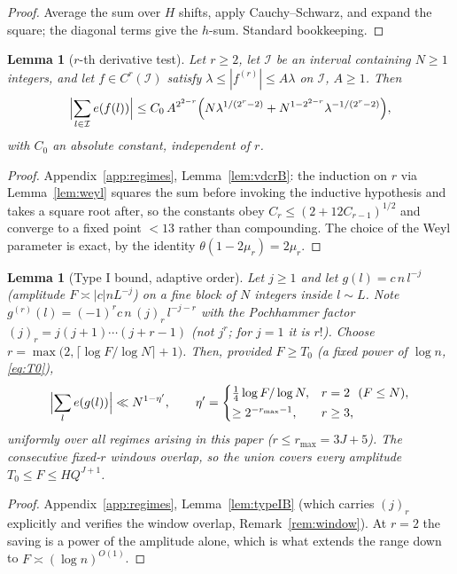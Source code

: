 \documentclass[11pt]{article}
\newtheorem{lemma}[theorem]{Lemma}
\theoremstyle{definition}
\theoremstyle{plain}
\begin{document}
\begin{proof}
Average the sum over $H$ shifts, apply Cauchy--Schwarz, and expand the
square; the diagonal terms give the $h$-sum.  Standard bookkeeping.
\end{proof}

\begin{lemma}[$r$-th derivative test]\label{lem:vdcr}
Let $r\ge2$, let $\mathcal I$ be an interval containing $N\ge1$
integers, and let $f\in C^r(\mathcal I)$ satisfy
$\lambda\le|f^{(r)}|\le A\lambda$ on $\mathcal I$, $A\ge1$.  Then
\[
\Bigl|\sum_{l\in\mathcal I}e(f(l))\Bigr|
\le C_{0}\,A^{2^{2-r}}\Bigl(N\lambda^{1/(2^{r}-2)}
+N^{1-2^{2-r}}\lambda^{-1/(2^{r}-2)}\Bigr),
\]
with $C_{0}$ an absolute constant, independent of $r$.
\end{lemma}

\begin{proof}
Appendix~\ref{app:regimes}, Lemma~\ref{lem:vdcrB}: the induction on $r$ via
Lemma~\ref{lem:weyl} squares the sum before invoking the inductive
hypothesis and takes a square root after, so the constants obey
$C_r\le(2+12C_{r-1})^{1/2}$ and converge to a fixed point $<13$ rather
than compounding.  The choice of the Weyl parameter is exact, by the
identity $\theta(1-2\mu_r)=2\mu_r$.
\end{proof}

\begin{lemma}[Type I bound, adaptive order]\label{lem:typeI}
Let $j\ge1$ and let $g(l)=c\,n\,l^{-j}$ (amplitude $F\asymp|c|nL^{-j}$)
on a fine block of $N$ integers inside $l\sim L$.  Note
$g^{(r)}(l)=(-1)^r c\,n\,(j)_r\,l^{-j-r}$ with the Pochhammer factor
$(j)_r=j(j+1)\cdots(j+r-1)$ (not $j^r$; for $j=1$ it is $r!$).  Choose
$r=\max\bigl(2,\lceil\log F/\log N\rceil+1\bigr)$.  Then, provided
$F\ge T_0$ (a fixed power of $\log n$, \eqref{eq:T0}),
\[
\Bigl|\sum_{l}e(g(l))\Bigr|\ll N^{1-\eta'},
\qquad
\eta'=\begin{cases}
\tfrac14\log F/\log N,& r=2\ \ (F\le N),\\[2pt]
\ge2^{-r_{\max}-1},& r\ge3,
\end{cases}
\]
uniformly over all regimes arising in this paper ($r\le r_{\max}=3J+5$).
The consecutive fixed-$r$ windows overlap, so the union covers every
amplitude $T_0\le F\le HQ^{J+1}$.
\end{lemma}

\begin{proof}
Appendix~\ref{app:regimes}, Lemma~\ref{lem:typeIB} (which carries $(j)_r$
explicitly and verifies the window overlap, Remark~\ref{rem:window}).
At $r=2$ the saving is a power of the amplitude alone, which is what
extends the range down to $F\asymp(\log n)^{O(1)}$.
\end{proof}
\end{document}
